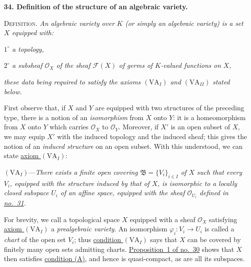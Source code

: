 
\medskip
{}\label{fac:II:1:no:34}
\textbf{34. Definition of the structure of an algebraic variety.}

\label{fac:II:1:no:34:def}
\textsc{Definition.} \textit{An algebraic variety over $K$ (or simply an algebraic variety) is a set $X$ equipped with:}

\label{fac:II:1:no:34:def:item:1}
\textit{$1^\circ$ a topology,}

\label{fac:II:1:no:34:def:item:2}
\textit{$2^\circ$ a subsheaf $\mathcal{O}_X$ of the sheaf $\mathcal{F}(X)$ of germs of $K$-valued functions on $X$,}

\textit{these data being required to satisfy the axioms $(\mathrm{VA}_I)$ and $(\mathrm{VA}_{II})$ stated below.}

First observe that, if $X$ and $Y$ are equipped with two structures of the preceding type, there is a notion of an \textit{isomorphism} from $X$ onto $Y$: it is a homeomorphism from $X$ onto $Y$ which carries $\mathcal{O}_X$ to $\mathcal{O}_Y$. Moreover, if $X'$ is an open subset of $X$, we may equip $X'$ with the induced topology and the induced sheaf; this gives the notion of an \textit{induced structure} on an open subset. With this understood, we can state \hyperref[fac:II:1:no:34:axiom:VA-I]{axiom $(\mathrm{VA}_I)$}:

\label{fac:II:1:no:34:axiom:VA-I}
$(\mathrm{VA}_I)$---\textit{There exists a finite open covering $\mathfrak{B}=\{V_i\}_{i\in I}$ of $X$ such that every $V_i$, equipped with the structure induced by that of $X$, is isomorphic to a locally closed subspace $U_i$ of an affine space, equipped with the sheaf $\mathcal{O}_{U_i}$ defined in \hyperref[fac:II:1:no:31]{no.~31}.}

For brevity, we call a topological space $X$ equipped with a sheaf $\mathcal{O}_X$ satisfying \hyperref[fac:II:1:no:34:axiom:VA-I]{axiom $(\mathrm{VA}_I)$} a \textit{prealgebraic variety}. An isomorphism $\varphi_i:V_i\to U_i$ is called a \textit{chart} of the open set $V_i$; thus \hyperref[fac:II:1:no:34:axiom:VA-I]{condition $(\mathrm{VA}_I)$} says that $X$ can be covered by finitely many open sets admitting charts. \hyperref[fac:II:1:no:30:prop:1]{Proposition~1 of no.~30} shows that $X$ then satisfies \hyperref[fac:II:1:no:30:condition:A]{condition (A)}, and hence is quasi-compact, as are all its subspaces.

